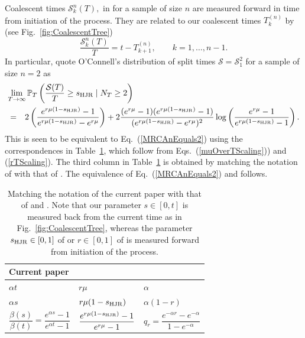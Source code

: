 \documentclass[preprint,12pt]{elsarticle}
\begin{document}
Coalescent times $\mathcal{S}^n_k(T),$ in \citet[p1371]{Harris20} for a sample of size $n$ are measured forward in time from initiation of the process.  
They are related to our coalescent times $T_k^{(n)}$ by (see Fig.~\ref{fig:CoalescentTree}) 
\[
\frac{\mathcal{S}^n_k(T)}{T} = t - T_{k + 1}^{(n)}, \qquad  k = 1, \ldots, n -1.  
\]
In particular, \cite{Harris20} quote O'Connell's distribution of split times $\mathcal{S} = \mathcal{S}^2_1$ for a sample of size $n = 2$ as 
\begin{eqnarray*}
\lefteqn{\lim_{T \to \infty} \mathbb{P}_T\left(\frac{\mathcal{S}(T)}{T} \ge s_{\rm HJR} \mid N_T \ge 2 \right)} \nonumber \\
	& = & 2\left(\frac{e^{r\mu(1 - s_{\rm HJR})} -1}{e^{r\mu(1 - s_{\rm HJR})} - e^{r\mu}}\right)
 +  2\frac{(e^{r\mu} -1)(e^{r\mu(1 - s_{\rm HJR})} - 1)}{(e^{r\mu(1 - s_{\rm HJR})} - e^{r\mu})^2} \log\left(\frac{e^{r\mu} - 1}{e^{r\mu(1 - s_{\rm HJR})} - 1}\right). 
\end{eqnarray*}
This is seen to be equivalent to Eq.~(\ref{MRCAnEquals2}) using the correspondences in Table~\ref{tab:HOparameters}, which follow from 
Eqs.~(\ref{muOverTScaling})) and (\ref{rTScaling}).  The third column in Table~\ref{tab:HOparameters} is obtained by matching the notation of 
\citet{Harris20} with that of \citet[Section~2]{o1995genealogy}.  The equivalence of Eq.~(\ref{MRCAnEquals2}) and \citet[Theorem~2.3 with $x=1$]{o1995genealogy} 
follows.  

\begin{table}[htbp]
   \centering
   \caption{Matching the notation of the current paper with that of \cite{Harris20} and \citet{o1995genealogy}.  Note that our parameter $s \in [0, t]$ is measured back from the 
   current time as in Fig.~\ref{fig:CoalescentTree}, whereas the parameter $s_{\rm HJR} \in [0, 1]$ of \cite{Harris20} or $r \in [0, 1]$ of \citet{o1995genealogy} is measured forward from 
   initiation of the process.}
   \begin{center}
   \begin{tabular}{lll} 
      \hline
	Current paper		&  \cite{Harris20}	& \citet{o1995genealogy}	\\
      \hline
	$\alpha t$			& $r\mu$			& $\alpha$ 			\\
	$\alpha s$			& $r\mu(1 - s_{\rm HJR})$		& $\alpha(1 - r)$ 		\\
	$\dfrac{\beta(s)}{\beta(t)} = \dfrac{e^{\alpha s} - 1}{e^{\alpha t} - 1}$ & $\dfrac{e^{r\mu(1 - s_{\rm HJR})} - 1}{e^{r\mu} - 1}$
							& $q_r = \dfrac{e^{-\alpha r} - e^{-\alpha}}{1 - e^{-\alpha}}$	\\
      \hline
   \end{tabular}
    \label{tab:HOparameters}
    \end{center}
\end{table}
\end{document}
